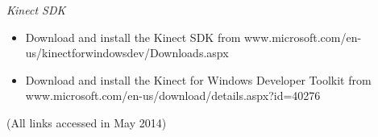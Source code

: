\par
\emph{Kinect SDK}
\begin{itemize}
\item Download and install the Kinect SDK from \newline www.microsoft.com/en-us/kinectforwindowsdev/Downloads.aspx
\item Download and install the Kinect for Windows Developer Toolkit from \newline www.microsoft.com/en-us/download/details.aspx?id=40276
\end{itemize}

\par (All links accessed in May 2014)